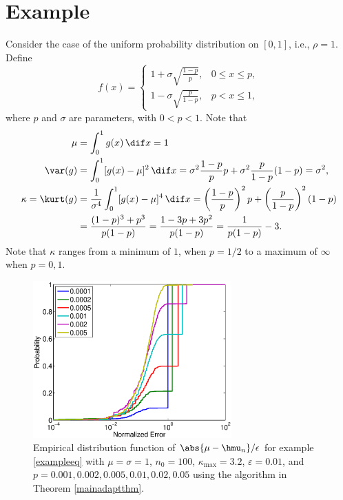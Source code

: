 \documentclass[12pt]{amsart}
\begin{document}

\section{Example}

Consider the case of the uniform probability distribution on $[0,1]$, i.e., $\rho=1$.  Define
\begin{equation} \label{exampleeq}
f(x) = \begin{cases} 1 + \sigma \sqrt{\frac{1-p}{p}}, & 0 \le x \le p,\\
1 - \sigma \sqrt{\frac{p}{1-p}}, & p < x \le 1,
\end{cases}
\end{equation}
where $p$ and $\sigma$ are parameters, with $0 < p < 1$.
Note that
\begin{align*}
\mu &= \int_0^1 g(x) \, \dif x = 1\\
\var(g) &= \int_0^1 [g(x)-\mu]^2 \, \dif x = \sigma^2 \frac{1-p}{p} p + \sigma^2 \frac{p}{1-p} (1-p) = \sigma^2, \\
\kappa = \kurt(g) &= \frac{1}{\sigma^4}\int_0^1 [g(x)-\mu]^4 \, \dif x = \left(\frac{1-p}{p}\right)^2 p + \left(\frac{p}{1-p} \right)^2 (1-p) \\
& = \frac{(1-p)^3 + p^3}{p(1-p)} = \frac{1-3p+3p^2}{p(1-p)} = \frac{1}{p(1-p)} - 3.
\end{align*}
Note that $\kappa$ ranges from a minimum of $1$, when $p=1/2$ to a maximum of $\infty$ when $p=0,1$.

\begin{figure}
\includegraphics[width=3in]{NormalErrFig.eps}
\caption{Empirical distribution function of $\abs{\mu-\hmu_n}/\epsilon$ for example \eqref{exampleeq} with $\mu=\sigma=1$, $n_0=100$, $\kappa_{\max} = 3.2$, $\varepsilon=0.01$, and  $p=0.001, 0.002, 0.005, 0.01, 0.02, 0.05$ using the algorithm in Theorem \ref{mainadaptthm}. \label{normalerrfig}}
\end{figure}
\end{document}
